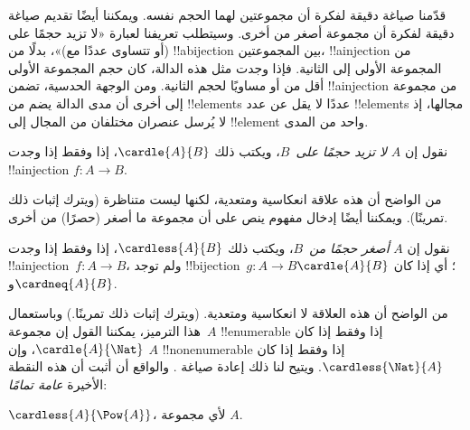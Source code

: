 \documentclass[../../../include/open-logic-section]{subfiles}
\begin{document}


\begin{explain}
قدّمنا صياغة دقيقة لفكرة أن مجموعتين لهما الحجم نفسه. ويمكننا أيضًا
تقديم صياغة دقيقة لفكرة أن مجموعة أصغر من أخرى. وسيتطلب تعريفنا لعبارة
«لا تزيد حجمًا على (أو تتساوى عددًا مع)»، بدلًا من !!a{bijection} بين
المجموعتين، !!a{injection} من المجموعة الأولى إلى الثانية. فإذا وجدت
مثل هذه الدالة، كان حجم المجموعة الأولى أقل من أو مساويًا لحجم الثانية.
ومن الوجهة الحدسية، تضمن !!a{injection} من مجموعة إلى أخرى أن مدى الدالة
يضم من !!{element}s عددًا لا يقل عن عدد !!{element}s مجالها، إذ لا
يُرسل عنصران مختلفان من المجال إلى !!{element} واحد من المدى.
\end{explain}

\begin{defn}
نقول إن $A$ \emph{لا تزيد حجمًا على}~$B$، ويكتب ذلك $\cardle{A}{B}$،
إذا وفقط إذا وجدت !!a{injection} $f \colon A \to B$.
\end{defn}

من الواضح أن هذه علاقة انعكاسية ومتعدية، لكنها ليست متناظرة (ويترك
إثبات ذلك تمرينًا). ويمكننا أيضًا إدخال مفهوم ينص على أن مجموعة ما
أصغر (حصرًا) من أخرى.

\begin{defn}
نقول إن $A$ \emph{أصغر حجمًا من}~$B$، ويكتب ذلك $\cardless{A}{B}$،
إذا وفقط إذا وجدت !!a{injection}~$f\colon A \to B$، ولم توجد
!!{bijection}~$g\colon A
\to B$؛ أي إذا كان $\cardle{A}{B}$ و$\cardneq{A}{B}$.
\end{defn}

من الواضح أن هذه العلاقة لا انعكاسية ومتعدية. (ويترك إثبات ذلك
تمرينًا.) وباستعمال هذا الترميز، يمكننا القول إن مجموعة~$A$
!!{enumerable} إذا وفقط إذا كان $\cardle{A}{\Nat}$، وإن $A$
!!{nonenumerable} إذا وفقط إذا كان $\cardless{\Nat}{A}$. ويتيح لنا ذلك
إعادة صياغة
. والواقع
أن \citet{Cantor1892} أثبت أن هذه النقطة الأخيرة \emph{عامة تمامًا}:

\begin{thm}[كانتور]
$\cardless{A}{\Pow{A}}$، لأي مجموعة $A$.
\end{thm}
\end{document}

